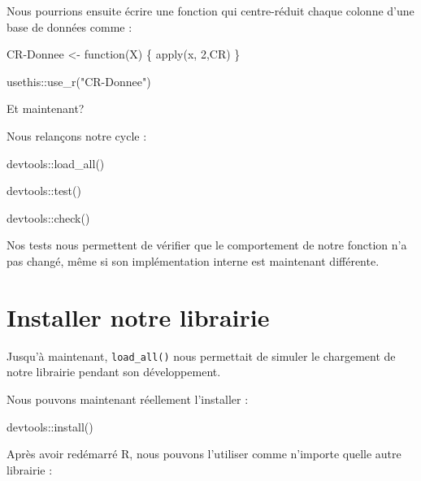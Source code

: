 \documentclass[
  letterpaper,
  DIV=11,
  numbers=noendperiod]{scrreprt}
\newenvironment{Shaded}{\begin{snugshade}}{\end{snugshade}}
\newcommand{\ControlFlowTok}[1]{\textcolor[rgb]{0.00,0.23,0.31}{#1}}
\newcommand{\DecValTok}[1]{\textcolor[rgb]{0.68,0.00,0.00}{#1}}
\newcommand{\FunctionTok}[1]{\textcolor[rgb]{0.28,0.35,0.67}{#1}}
\newcommand{\NormalTok}[1]{\textcolor[rgb]{0.00,0.23,0.31}{#1}}
\newcommand{\OtherTok}[1]{\textcolor[rgb]{0.00,0.23,0.31}{#1}}
\newcommand{\SpecialCharTok}[1]{\textcolor[rgb]{0.37,0.37,0.37}{#1}}
\newcommand{\StringTok}[1]{\textcolor[rgb]{0.13,0.47,0.30}{#1}}
\begin{document}
Nous pourrions ensuite écrire une fonction qui centre-réduit chaque
colonne d'une base de données comme :

\begin{Shaded}
\begin{Highlighting}[]
\NormalTok{CR}\SpecialCharTok{{-}}\NormalTok{Donnee }\OtherTok{\textless{}{-}} \ControlFlowTok{function}\NormalTok{(X) \{}
  \FunctionTok{apply}\NormalTok{(x, }\DecValTok{2}\NormalTok{,CR)}
\NormalTok{\}}

\NormalTok{usethis}\SpecialCharTok{::}\FunctionTok{use\_r}\NormalTok{(}\StringTok{"CR{-}Donnee"}\NormalTok{)}
\end{Highlighting}
\end{Shaded}

Et maintenant?

Nous relançons notre cycle :

\begin{Shaded}
\begin{Highlighting}[]
\NormalTok{devtools}\SpecialCharTok{::}\FunctionTok{load\_all}\NormalTok{()}

\NormalTok{devtools}\SpecialCharTok{::}\FunctionTok{test}\NormalTok{()}

\NormalTok{devtools}\SpecialCharTok{::}\FunctionTok{check}\NormalTok{()}
\end{Highlighting}
\end{Shaded}

Nos tests nous permettent de vérifier que le comportement de notre
fonction n'a pas changé, même si son implémentation interne est
maintenant différente.

\section{Installer notre librairie}\label{installer-notre-librairie}

Jusqu'à maintenant, \texttt{load\_all()} nous permettait de simuler le
chargement de notre librairie pendant son développement.

Nous pouvons maintenant réellement l'installer :

\begin{Shaded}
\begin{Highlighting}[]
\NormalTok{devtools}\SpecialCharTok{::}\FunctionTok{install}\NormalTok{()}
\end{Highlighting}
\end{Shaded}

Après avoir redémarré R, nous pouvons l'utiliser comme n'importe quelle
autre librairie :
\end{document}
